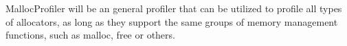 
MallocProfiler will be an general profiler that can be utilized to profile all types of allocators, as long as they support the same groups of memory management functions, such as malloc, free or others. 
 